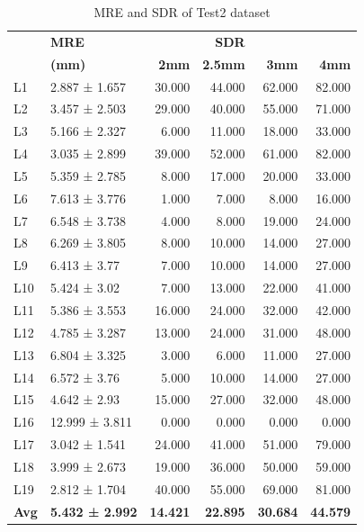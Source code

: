 \documentclass[sn-mathphys]{sn-jnl}%
\theoremstyle{thmstyleone}%
\theoremstyle{thmstyletwo}%
\theoremstyle{thmstylethree}%
\begin{document}
 \begin{table}[ht!]
 \centering
 \begin{tabular}{llrrrr}
\toprule
 &                \textbf{MRE}         &            &  \textbf{SDR} &\\
    &             \textbf{(mm)}&       \textbf{2mm} &       \textbf{2.5mm} &       \textbf{3mm}&       \textbf{4mm} \\
\midrule
  L1 &   2.887 ± 1.657 &  30.000 &  44.000 &  62.000 &  82.000 \\
  L2 &   3.457 ± 2.503 &  29.000 &  40.000 &  55.000 &  71.000 \\
  L3 &   5.166 ± 2.327 &   6.000 &  11.000 &  18.000 &  33.000 \\
  L4 &   3.035 ± 2.899 &  39.000 &  52.000 &  61.000 &  82.000 \\
  L5 &   5.359 ± 2.785 &   8.000 &  17.000 &  20.000 &  33.000 \\
  L6 &   7.613 ± 3.776 &   1.000 &   7.000 &   8.000 &  16.000 \\
  L7 &   6.548 ± 3.738 &   4.000 &   8.000 &  19.000 &  24.000 \\
  L8 &   6.269 ± 3.805 &   8.000 &  10.000 &  14.000 &  27.000 \\
  L9 &    6.413 ± 3.77 &   7.000 &  10.000 &  14.000 &  27.000 \\
 L10 &    5.424 ± 3.02 &   7.000 &  13.000 &  22.000 &  41.000 \\
 L11 &   5.386 ± 3.553 &  16.000 &  24.000 &  32.000 &  42.000 \\
 L12 &   4.785 ± 3.287 &  13.000 &  24.000 &  31.000 &  48.000 \\
 L13 &   6.804 ± 3.325 &   3.000 &   6.000 &  11.000 &  27.000 \\
 L14 &    6.572 ± 3.76 &   5.000 &  10.000 &  14.000 &  27.000 \\
 L15 &    4.642 ± 2.93 &  15.000 &  27.000 &  32.000 &  48.000 \\
 L16 &  12.999 ± 3.811 &   0.000 &   0.000 &   0.000 &   0.000 \\
 L17 &   3.042 ± 1.541 &  24.000 &  41.000 &  51.000 &  79.000 \\
 L18 &   3.999 ± 2.673 &  19.000 &  36.000 &  50.000 &  59.000 \\
 L19 &   2.812 ± 1.704 &  40.000 &  55.000 &  69.000 &  81.000 \\
 \textbf{Avg} &  \textbf{5.432 ± 2.992} &  \textbf{14.421} &  \textbf{22.895} &  \textbf{30.684} &  \textbf{44.579} \\
\bottomrule
\end{tabular}
\caption{MRE and SDR of Test2 dataset}
\label{table:5.2}
\end{table}
\end{document}

